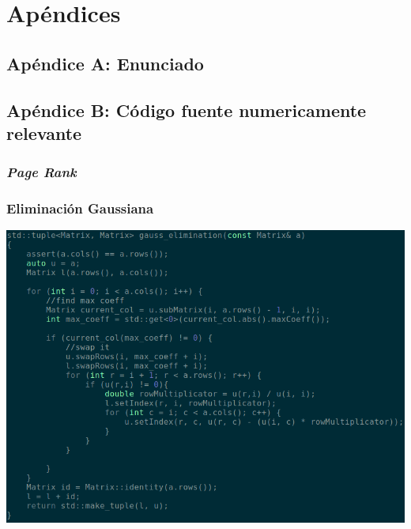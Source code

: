 \section{Apéndices}

	\subsection{Apéndice A: Enunciado}
		

	\subsection{Apéndice B: Código fuente numericamente relevante}
	\clearpage


		\subsubsection{\textit{Page Rank}}

			


		\subsubsection{Eliminación Gaussiana}

			\includegraphics[scale=0.6]{img/src/gaussian_elimination}


